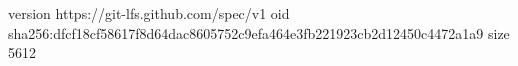 version https://git-lfs.github.com/spec/v1
oid sha256:dfcf18cf58617f8d64dac8605752c9efa464e3fb221923cb2d12450c4472a1a9
size 5612
